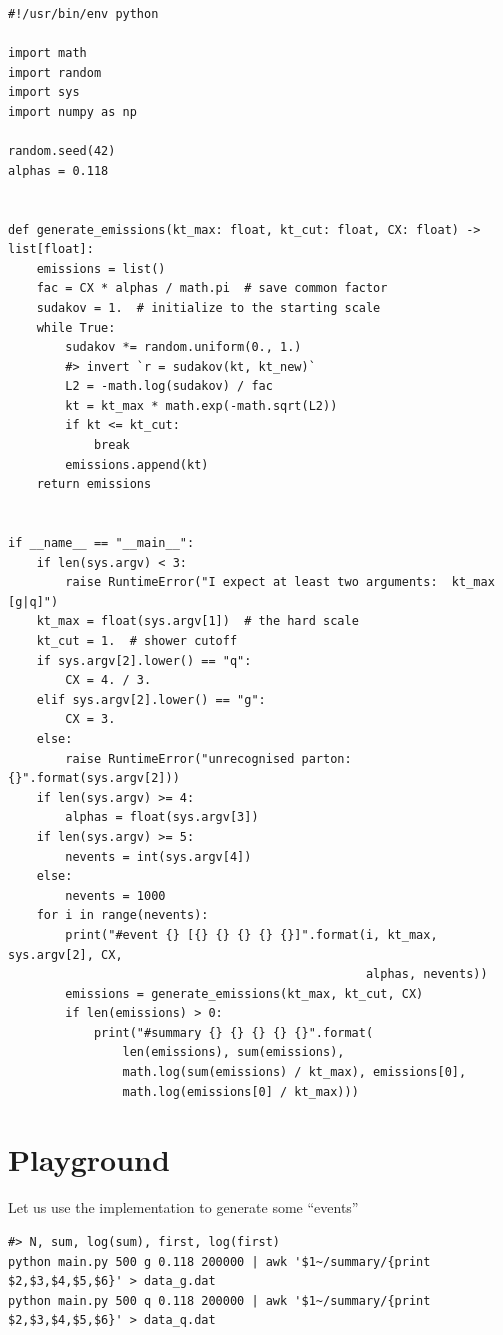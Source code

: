 \documentclass[11pt]{article}
\begin{document}
\begin{verbatim}
#!/usr/bin/env python

import math
import random
import sys
import numpy as np

random.seed(42)
alphas = 0.118


def generate_emissions(kt_max: float, kt_cut: float, CX: float) -> list[float]:
    emissions = list()
    fac = CX * alphas / math.pi  # save common factor
    sudakov = 1.  # initialize to the starting scale
    while True:
        sudakov *= random.uniform(0., 1.)
        #> invert `r = sudakov(kt, kt_new)`
        L2 = -math.log(sudakov) / fac
        kt = kt_max * math.exp(-math.sqrt(L2))
        if kt <= kt_cut:
            break
        emissions.append(kt)
    return emissions


if __name__ == "__main__":
    if len(sys.argv) < 3:
        raise RuntimeError("I expect at least two arguments:  kt_max [g|q]")
    kt_max = float(sys.argv[1])  # the hard scale
    kt_cut = 1.  # shower cutoff
    if sys.argv[2].lower() == "q":
        CX = 4. / 3.
    elif sys.argv[2].lower() == "g":
        CX = 3.
    else:
        raise RuntimeError("unrecognised parton: {}".format(sys.argv[2]))
    if len(sys.argv) >= 4:
        alphas = float(sys.argv[3])
    if len(sys.argv) >= 5:
        nevents = int(sys.argv[4])
    else:
        nevents = 1000
    for i in range(nevents):
        print("#event {} [{} {} {} {} {}]".format(i, kt_max, sys.argv[2], CX,
                                                  alphas, nevents))
        emissions = generate_emissions(kt_max, kt_cut, CX)
        if len(emissions) > 0:
            print("#summary {} {} {} {} {}".format(
                len(emissions), sum(emissions),
                math.log(sum(emissions) / kt_max), emissions[0],
                math.log(emissions[0] / kt_max)))
\end{verbatim}

\section{Playground}
\label{sec:org3c74740}
Let us use the implementation to generate some ``events''
\begin{verbatim}
#> N, sum, log(sum), first, log(first)
python main.py 500 g 0.118 200000 | awk '$1~/summary/{print $2,$3,$4,$5,$6}' > data_g.dat
python main.py 500 q 0.118 200000 | awk '$1~/summary/{print $2,$3,$4,$5,$6}' > data_q.dat
\end{verbatim}
\end{document}
